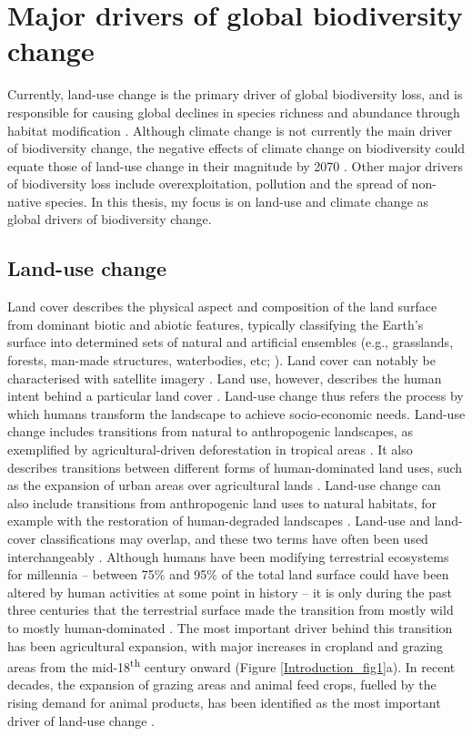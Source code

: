 \section{Major drivers of global biodiversity change}

Currently, land-use change is the primary driver of global biodiversity loss, and is responsible for causing global declines in species richness and abundance through habitat modification \citep{Newbold2015, Chaudhary2018a, Nowakowski2018a, Powers2019, Maxwell2016}. Although climate change is not currently the main driver of biodiversity change, the negative effects of climate change on biodiversity could equate those of land-use change in their magnitude by 2070 \citep{Newbold2018}. Other major drivers of biodiversity loss include overexploitation, pollution and the spread of non-native species. In this thesis, my focus is on land-use and climate change as global drivers of biodiversity change.

\subsection{Land-use change}

Land cover describes the physical aspect and composition of the land surface from dominant biotic and abiotic features, typically classifying the Earth’s surface into determined sets of natural and artificial ensembles (e.g., grasslands, forests, man-made structures, waterbodies, etc; \citet{Grekousis2015}). Land cover can notably be characterised with satellite imagery \citep{Wulder2018}. Land use, however, describes the human intent behind a particular land cover \citep{Lambin2001}. Land-use change thus refers the process by which humans transform the landscape to achieve socio-economic needs. Land-use change includes transitions from natural to anthropogenic landscapes, as exemplified by agricultural-driven deforestation in tropical areas \citep{Jayathilake2021}. It also describes transitions between different forms of human-dominated land uses, such as the expansion of urban areas over agricultural lands \citep{Ustaoglu2017}. Land-use change can also include transitions from anthropogenic land uses to natural habitats, for example with the restoration of human-degraded landscapes \citep{BanksLeite2020}. Land-use and land-cover classifications may overlap, and these two terms have often been used interchangeably \citep{Comber2008}. Although humans have been modifying terrestrial ecosystems for millennia – between 75\% and 95\% of the total land surface could have been altered by human activities at some point in history  \citep{Ellis2013, Ellis2021} – it is only during the past three centuries that the terrestrial surface made the transition from mostly wild to mostly human-dominated \citep{Ellis2010}. The most important driver behind this transition has been agricultural expansion, with major increases in cropland and grazing areas from the mid-18\textsuperscript{th} century onward (Figure \ref{Introduction_fig1}a). In recent decades, the expansion of grazing areas and animal feed crops, fuelled by the rising demand for animal products, has been identified as the most important driver of land-use change \citep{Alexander2015}. 

